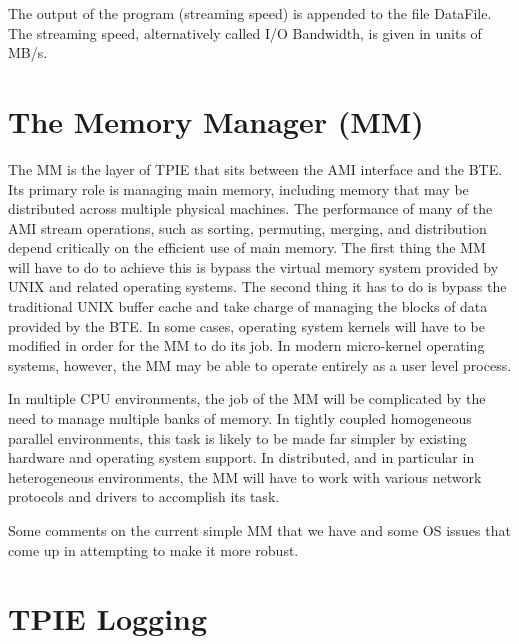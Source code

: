 The output of the program (streaming speed) is appended to the file
DataFile. The streaming speed, alternatively called I/O Bandwidth,
is given in units of MB/s.



\section{The Memory Manager (MM)}
\label{sec:ref-mm}

The MM is the layer of TPIE that sits between the AMI interface and the
BTE.  Its primary role is managing main memory, including memory that
may be distributed across multiple physical machines.  The performance
of many of the AMI stream operations, such as sorting, permuting,
merging, and distribution depend critically on the efficient use of
main memory.  The first thing the MM will have to do to achieve this
is bypass the virtual memory system provided by UNIX and related
operating systems.  The second thing it has to do is bypass the
traditional UNIX buffer cache and take charge of managing the blocks
of data provided by the BTE.  In some cases, operating system kernels
will have to be modified in order for the MM to do its job.  In modern
micro-kernel operating systems, however, the MM may be able to operate
entirely as a user level process.

In multiple CPU environments, the job of the MM will be complicated by
the need to manage multiple banks of memory.  In tightly coupled
homogeneous parallel environments, this task is likely to be made far
simpler by existing hardware and operating system support.  In
distributed, and in particular in heterogeneous environments, the MM
will have to work with various network protocols and drivers to
accomplish its task.

Some comments on the current simple MM that we have and some OS issues
that come up in attempting to make it more robust.

\section{TPIE Logging}
\label{sec:logging}

